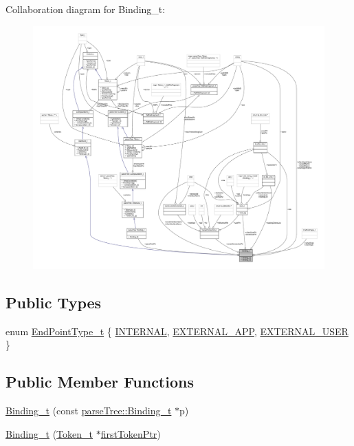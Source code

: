 Collaboration diagram for Binding\+\_\+t\+:
\nopagebreak
\begin{figure}[H]
\begin{center}
\leavevmode
\includegraphics[width=350pt]{struct_binding__t__coll__graph}
\end{center}
\end{figure}
\subsection*{Public Types}
\begin{DoxyCompactItemize}
\item 
enum \hyperlink{struct_binding__t_a03d855e6b3e39d0542d365c9fa9884e7}{End\+Point\+Type\+\_\+t} \{ \hyperlink{struct_binding__t_a03d855e6b3e39d0542d365c9fa9884e7a719972f6d6fac12f8aa8c0f7138a865a}{I\+N\+T\+E\+R\+N\+AL}, 
\hyperlink{struct_binding__t_a03d855e6b3e39d0542d365c9fa9884e7a80bb0efecfd3a58083600bee51ce34dd}{E\+X\+T\+E\+R\+N\+A\+L\+\_\+\+A\+PP}, 
\hyperlink{struct_binding__t_a03d855e6b3e39d0542d365c9fa9884e7a6f74caf4ed8d6942ce88b8a67b774674}{E\+X\+T\+E\+R\+N\+A\+L\+\_\+\+U\+S\+ER}
 \}
\end{DoxyCompactItemize}
\subsection*{Public Member Functions}
\begin{DoxyCompactItemize}
\item 
\hyperlink{struct_binding__t_a4566c244a9e2f9486d048ea4a8fe48a5}{Binding\+\_\+t} (const \hyperlink{structparse_tree_1_1_binding__t}{parse\+Tree\+::\+Binding\+\_\+t} $\ast$p)
\item 
\hyperlink{struct_binding__t_ae5ccb685eca4b60d42a0206eb705970a}{Binding\+\_\+t} (\hyperlink{struct_token__t}{Token\+\_\+t} $\ast$\hyperlink{struct_compound_item__t_a4d95dc788120f627e332491589d20c5c}{first\+Token\+Ptr})
\end{DoxyCompactItemize}
